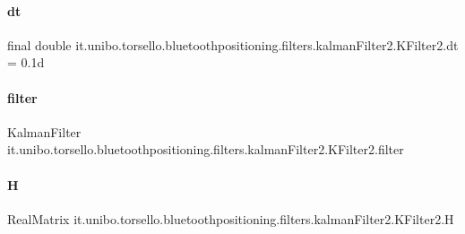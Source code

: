 \paragraph{\texorpdfstring{dt}{dt}}
{\footnotesize\ttfamily final double it.\+unibo.\+torsello.\+bluetoothpositioning.\+filters.\+kalman\+Filter2.\+K\+Filter2.\+dt = 0.\+1d\hspace{0.3cm}{\ttfamily [private]}}

\hypertarget{classit_1_1unibo_1_1torsello_1_1bluetoothpositioning_1_1filters_1_1kalmanFilter2_1_1KFilter2_a421a61f6c29cfad7a9faac33935a0b96_a421a61f6c29cfad7a9faac33935a0b96}{}\label{classit_1_1unibo_1_1torsello_1_1bluetoothpositioning_1_1filters_1_1kalmanFilter2_1_1KFilter2_a421a61f6c29cfad7a9faac33935a0b96_a421a61f6c29cfad7a9faac33935a0b96} 
\paragraph{\texorpdfstring{filter}{filter}}
{\footnotesize\ttfamily Kalman\+Filter it.\+unibo.\+torsello.\+bluetoothpositioning.\+filters.\+kalman\+Filter2.\+K\+Filter2.\+filter\hspace{0.3cm}{\ttfamily [private]}}

\hypertarget{classit_1_1unibo_1_1torsello_1_1bluetoothpositioning_1_1filters_1_1kalmanFilter2_1_1KFilter2_a4a7f02c99b3659ca45be7d0a336fe37b_a4a7f02c99b3659ca45be7d0a336fe37b}{}\label{classit_1_1unibo_1_1torsello_1_1bluetoothpositioning_1_1filters_1_1kalmanFilter2_1_1KFilter2_a4a7f02c99b3659ca45be7d0a336fe37b_a4a7f02c99b3659ca45be7d0a336fe37b} 
\paragraph{\texorpdfstring{H}{H}}
{\footnotesize\ttfamily Real\+Matrix it.\+unibo.\+torsello.\+bluetoothpositioning.\+filters.\+kalman\+Filter2.\+K\+Filter2.\+H\hspace{0.3cm}{\ttfamily [private]}}

